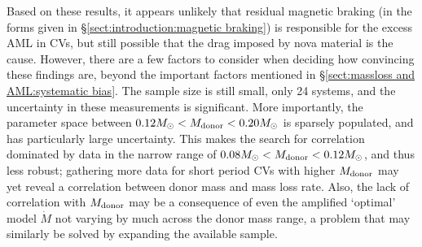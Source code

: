 Based on these results, it appears unlikely that residual magnetic braking (in the forms given in \S\ref{sect:introduction:magnetic braking}) is responsible for the excess AML in CVs, but still possible that the drag imposed by nova material is the cause.
However, there are a few factors to consider when deciding how convincing these findings are, beyond the important factors mentioned in \S\ref{sect:massloss and AML:systematic bias}.
The sample size is still small, only 24 systems, and the uncertainty in these measurements is significant.
More importantly, the parameter space between $0.12 M_\odot < M_{\rm donor} < 0.20 M_\odot$ is sparsely populated, and has particularly large uncertainty. This makes the search for correlation dominated by data in the narrow range of $0.08 M_\odot < M_{\rm donor} < 0.12 M_\odot$, and thus less robust; gathering more data for short period CVs with higher $M_{\rm donor}$ may yet reveal a correlation between donor mass and mass loss rate.
Also, the lack of correlation with $M_{\rm donor}$ may be a consequence of even the amplified `optimal' model $\dot M$ not varying by much across the donor mass range, a problem that may similarly be solved by expanding the available sample.
